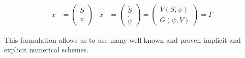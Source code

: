 \begin{align}
	\label{eq:ODE_formulation_SEAS}
	x &= \begin{pmatrix}
		S \\ \psi
	\end{pmatrix} & \dot{x} &= \begin{pmatrix}
								  \dot{S} \\ \dot{\psi}
							   \end{pmatrix} = \begin{pmatrix}
												   V(S,\psi) \\ G(\psi, V)
											   \end{pmatrix} = \Gamma
\end{align} 

This formulation allows us to use many well-known and proven implicit and explicit numerical schemes. 

